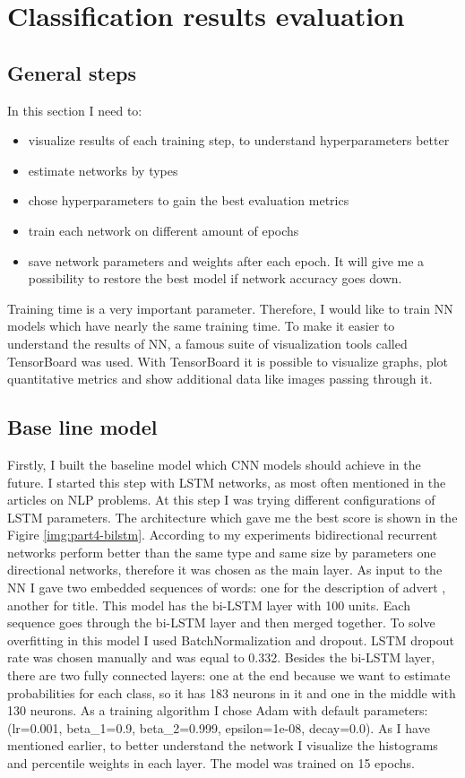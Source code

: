 \chapter{Classification results evaluation} \label{chapt4}

\section{General steps} \label{sect4_1}
\noindent
In this section I need to:
\begin{itemize}
	\item visualize results of each training step, to understand hyperparameters better
	\item estimate networks by types 
	\item chose hyperparameters to gain the best evaluation metrics  
	\item train each network on different amount of epochs
	\item save network parameters and weights after each epoch. It will give me a possibility to restore the best model if network accuracy goes down.
\end{itemize}

\noindent
Training time is a very important parameter. Therefore, I would like to train NN models which have nearly the same training time. To make it easier to understand the results of NN, a famous suite of visualization tools called TensorBoard was used. With TensorBoard it is possible to visualize graphs, plot quantitative metrics and show additional data like images passing through it.  


\section{Base line model} \label{sect4_2}

Firstly, I built the baseline model which CNN models should achieve in the future. I started this step with LSTM networks, as most often mentioned in the articles on NLP problems. At this step I was trying different configurations of LSTM parameters. The architecture which gave me the best score is shown in the Figire \ref{img:part4-bilstm}. According to my experiments bidirectional recurrent networks perform better than the same type and same size by parameters one directional networks, therefore it was chosen as the main layer. As input to the NN I gave two embedded sequences of words: one for the description of advert , another for title. This model has the bi-LSTM layer with 100 units. Each sequence goes through the bi-LSTM layer and then merged together. To solve overfitting in this model I used BatchNormalization and dropout. LSTM dropout rate was chosen manually and was equal to 0.332. Besides the bi-LSTM layer, there are two fully connected layers: one at the end because we want to estimate probabilities for each class, so it has 183 neurons in it and one in the middle with 130 neurons. As a training algorithm I chose Adam with default parameters: (lr=0.001, beta\_1=0.9, beta\_2=0.999, epsilon=1e-08, decay=0.0). As I have mentioned earlier, to better understand the network I visualize the histograms and percentile weights in each layer. The model was trained on 15 epochs.


